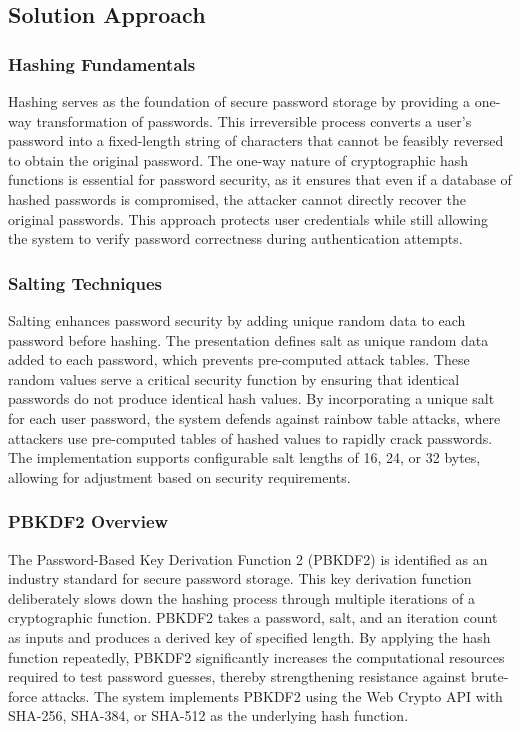 \documentclass[11pt,a4paper]{article}
\begin{document}
\subsection{Solution Approach}
\subsubsection{Hashing Fundamentals}
Hashing serves as the foundation of secure password storage by providing a one-way transformation of passwords. This irreversible process converts a user's password into a fixed-length string of characters that cannot be feasibly reversed to obtain the original password. The one-way nature of cryptographic hash functions is essential for password security, as it ensures that even if a database of hashed passwords is compromised, the attacker cannot directly recover the original passwords. This approach protects user credentials while still allowing the system to verify password correctness during authentication attempts.

\subsubsection{Salting Techniques}
Salting enhances password security by adding unique random data to each password before hashing. The presentation defines salt as unique random data added to each password, which prevents pre-computed attack tables. These random values serve a critical security function by ensuring that identical passwords do not produce identical hash values. By incorporating a unique salt for each user password, the system defends against rainbow table attacks, where attackers use pre-computed tables of hashed values to rapidly crack passwords. The implementation supports configurable salt lengths of 16, 24, or 32 bytes, allowing for adjustment based on security requirements.

\subsubsection{PBKDF2 Overview}
The Password-Based Key Derivation Function 2 (PBKDF2) is identified as an industry standard for secure password storage. This key derivation function deliberately slows down the hashing process through multiple iterations of a cryptographic function. PBKDF2 takes a password, salt, and an iteration count as inputs and produces a derived key of specified length. By applying the hash function repeatedly, PBKDF2 significantly increases the computational resources required to test password guesses, thereby strengthening resistance against brute-force attacks. The system implements PBKDF2 using the Web Crypto API with SHA-256, SHA-384, or SHA-512 as the underlying hash function.
\end{document}
